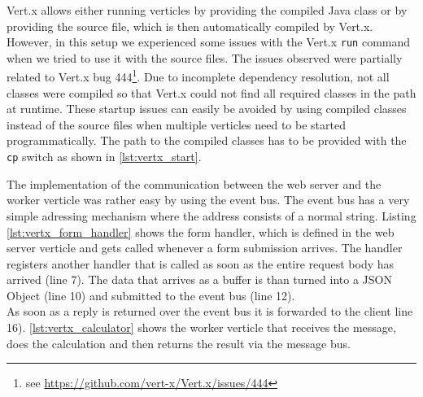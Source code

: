 

Vert.x allows either running verticles by providing the compiled Java class or by providing the
source file, which is then automatically compiled by Vert.x. However, in this
setup we experienced some issues with the Vert.x \texttt{run} command when we tried to
use it with the source files. The issues observed were partially related to
Vert.x bug 444\footnote{see \url{https://github.com/vert-x/Vert.x/issues/444}}.
Due to incomplete dependency resolution, not all classes were compiled so that
Vert.x could not find all required classes in the path at runtime.
These startup issues can easily be avoided by using compiled classes instead of
the source files when multiple verticles need to be started programmatically.
The path to the compiled classes has to be provided with the \texttt{cp} switch as
shown in \autoref{lst:vertx_start}.

\clearpage





The implementation of the communication between the web server and the worker
verticle was rather easy by using the event bus. The event bus has a very
simple adressing mechanism where the address consists of a normal string.
Listing \ref{lst:vertx_form_handler} shows the form handler, which is defined
in the web server verticle and gets called whenever a form submission arrives.
The handler registers another handler that is called as soon as the entire
request body has arrived (line 7). The data that arrives as a buffer is than
turned into a JSON Object (line 10) and submitted to the event bus (line 12).\\
As soon as a reply is returned over the event bus it is forwarded to the client line 16).
\autoref{lst:vertx_calculator} shows the worker verticle that receives
the message, does the calculation and then returns the result via the message bus.

